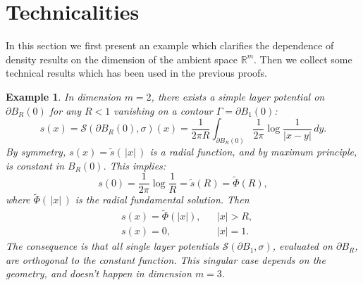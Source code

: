 \documentclass[10pt, a4paper, twoside, openright]{book}
\theoremstyle{definition}
\theoremstyle{plain}
\theoremstyle{plain}
\theoremstyle{plain}
\theoremstyle{plain}
\theoremstyle{plain}
\theoremstyle{plain}
\newtheorem{example}[subsection]{Example}
\theoremstyle{plain}
\theoremstyle{plain}
\begin{document}
\section{Technicalities}
In this section we first present an example which clarifies the dependence of density results 
on the dimension of the ambient space $\mathbb{R}^m$. Then we collect some technical results 
which has been used in the previous proofs.
\begin{example}
 \label{example:van-s-lay}
 In dimension $m=2$, there exists a simple layer potential on $\partial B_R(0)$ for any $R<1$ vanishing on a contour $\Gamma = \partial B_1(0)$:
 \begin{equation}
 s(x) = \mathcal{S}(\partial B_R(0), \sigma)(x) = \frac{1}{2\pi R}\int_{\partial B_R(0)}\frac{1}{2\pi}\log\frac{1}{|x-y|}\,dy.
 \end{equation}
 By symmetry, $s(x)=\tilde{s}(\,|x|\,)$ is a radial function, and by maximum principle, is constant in $B_R(0)$. This implies:
 \begin{equation}
  s(0) = \frac{1}{2\pi}\log\frac{1}{R}=\tilde{s}(R)=\tilde{\Phi}(R),
 \end{equation}
 where $\tilde{\Phi}(\,|x|\,)$ is the radial fundamental solution. Then
 \begin{align}
 & s(x) = \tilde{\Phi}(|x|), && |x| > R, \\
 & s(x) = 0,         && |x| = 1.
 \end{align}
 The consequence is that all single layer potentials $\mathcal{S}(\partial B_1, \sigma)$, evaluated on $\partial B_R$, are orthogonal to the constant function. This singular case depends on the geometry, and doesn't happen in dimension $m=3$.
\end{example}
\end{document}
